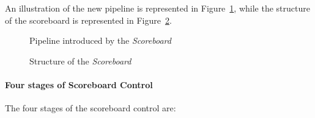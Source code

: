 \documentclass[english]{article}
\begin{document}
\bigskip
An illustration of the new pipeline is represented in Figure~\ref{fig:pipeline-of-scoreboard}, while the structure of the scoreboard is represented in Figure~\ref{fig:structure-of-scoreboard}.

\begin{figure}[htbp]
  \bigskip
  \centering
  \caption{Pipeline introduced by the \textit{Scoreboard}}
  \label{fig:pipeline-of-scoreboard}
  \bigskip
\end{figure}

\begin{figure}[htbp]
  \bigskip
  \centering
  \caption{Structure of the \textit{Scoreboard}}
  \label{fig:structure-of-scoreboard}
  \bigskip
\end{figure}

\paragraph{Four stages of Scoreboard Control}

The four stages of the scoreboard control are:
\end{document}
